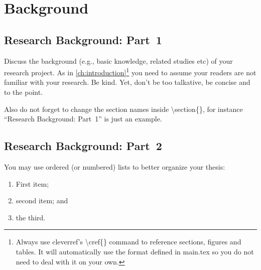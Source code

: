 \chapter{Background}\label{ch:background}

\section{Research Background: Part~1}\label{sec:background1}

Discuss the background (e.g., basic knowledge, related studies etc) of your research project.
As in \cref{ch:introduction}\footnote{Always use cleverref's {\textbackslash}cref\{\} command to reference sections, figures and tables. It will automatically use the format defined in main.tex so you do not need to deal with it on your own.} you need to assume your readers are not familiar with your research. Be kind.
Yet, don't be too talkative, be concise and to the point.

Also do not forget to change the section names inside {\textbackslash}section\{\}, for instance ``Research Background: Part~1'' is just an example.

\section{Research Background: Part~2}\label{sec:background2}

You may use ordered (or numbered) lists to better organize your thesis:
\begin{enumerate}
  \item First item;
  \item second item; and
  \item the third.
\end{enumerate}